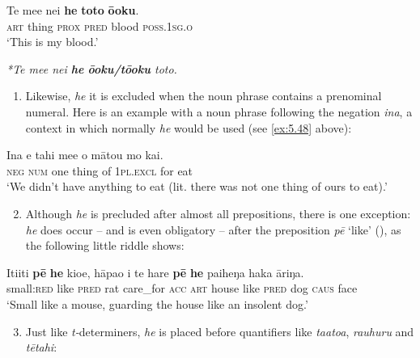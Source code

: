 \ea\label{ex:5.50}
\gll Te me{\ꞌ}e nei \textbf{he} \textbf{toto} \textbf{ō{\ꞌ}oku}. \\
\textsc{art} thing \textsc{prox} \textsc{pred} blood \textsc{poss.1sg.o} \\

\glt 
‘This is my blood.’ \textstyleExampleref{[Luke 22:20]}
\z

\ea\label{ex:5.51}
\textit{*Te me{\ꞌ}e nei \textbf{he} \textbf{ō{\ꞌ}oku}\textbf{/tō{\ꞌ}oku} toto.}
\z

\begin{enumerate}
\item[]
Likewise, \textit{he} it is excluded when the noun phrase contains a prenominal numeral. Here is an example with a noun phrase following the negation \textit{{\ꞌ}ina}, a context in which normally \textit{he} would be used (see \ref{ex:5.48} above):
\end{enumerate}

\ea\label{ex:5.52}
\gll {\ꞌ}Ina e tahi me{\ꞌ}e o mātou mo kai.\\
\textsc{neg} \textsc{num} one thing of \textsc{1pl.excl} for eat\\

\glt 
‘We didn’t have anything to eat (lit. there was not one thing of ours to eat).’ \textstyleExampleref{[R130.002]}  
\z

\begin{enumerate}
\setcounter{enumi}{1}
\item
Although \textit{he} is precluded after almost all prepositions, there is one exception: \textit{he} does occur – and is even obligatory – after the preposition \textit{pē} ‘like’ (), as the following little riddle shows:
\end{enumerate}

\ea\label{ex:5.53}
\gll {\ꞌ}Iti{\ꞌ}iti \textbf{pē} \textbf{he} kio{\ꞌ}e, hāpa{\ꞌ}o i te hare \textbf{pē} \textbf{he} paiheŋa haka {\ꞌ}āriŋa. \\
small:\textsc{red} like \textsc{pred} rat care\_for \textsc{acc} \textsc{art} house like \textsc{pred} dog \textsc{caus} face\\

\glt 
‘Small like a mouse, guarding the house like an insolent dog.’ \textstyleExampleref{[R144.007]} 
\z

\begin{enumerate}
\setcounter{enumi}{2}
\item
Just like \textit{t-}determiners, \textit{he} is placed before quantifiers like \textit{\mbox{ta{\ꞌ}ato{\ꞌ}a}}, \textit{rauhuru} and \textit{tētahi}:
\end{enumerate}

